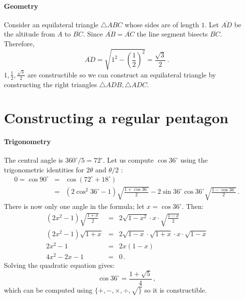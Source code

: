 \documentclass[11pt,a4paper]{article}
\newenvironment{form}[1]{%
\begin{displaymath}%
\renewcommand{\arraystretch}{#1}%
\begin{array}{lcl}}%
{\end{array}%
\end{displaymath}%
}
\newcommand*{\disfrac}[2]{\displaystyle\frac{#1}{#2}}
\begin{document}
\paragraph{Geometry} Consider an equilateral triangle $\triangle ABC$ whose sides are of length $1$. Let $\overline{AD}$ be the altitude from $A$ to $\overline{BC}$. Since $\overline{AB}=\overline{AC}$ the line segment bisects $\overline{BC}$. Therefore,
\[
\overline{AD}=\sqrt{1^2-\left(\disfrac{1}{2}\right)^2}=\disfrac{\sqrt{3}}{2}\,.
\]
$1,\frac{1}{2},\frac{\sqrt{3}}{2}$ are constructible so we can construct an equilateral triangle by constructing the right triangles $\triangle ADB,\triangle ADC$.
\begin{center}
\end{center}

\section{Constructing a regular pentagon}\label{a.pentagon}

\paragraph{Trigonometry}
The central angle is $360^\circ/5=72^\circ$. Let us compute $\cos 36^\circ$ using the  trigonometric identities for $2\theta$ and $\theta/2$ \cite{wiki:pentagon}:
\begin{form}{1.5}
0=\cos 90^\circ &=& \cos(72^\circ+18^\circ)\\
&=&(2\cos^2 36^\circ-1)\sqrt{\disfrac{1+\cos 36^\circ}{2}}-2\sin 36^\circ\cos 36^\circ\sqrt{\disfrac{1-\cos 36^\circ}{2}}\,.
\end{form}
There is now only one angle in the formula; let $x=\cos 36^\circ$. Then:
\begin{form}{1.5}
(2x^2-1)\sqrt{\disfrac{1+x}{2}}&=&2\sqrt{1-x^2}\cdot x \cdot \sqrt{\disfrac{1-x}{2}}\\
(2x^2-1)\sqrt{1+x}&=&2\sqrt{1-x}\cdot\sqrt{1+x}\cdot x \cdot \sqrt{1-x}\\
2x^2-1&=&2x(1-x)\\
4x^2-2x-1&=&0\,.
\end{form}
Solving the quadratic equation gives:
\[
\cos 36^\circ = \disfrac{1+\sqrt{5}}{4}\,,
\]
which can be computed using $\{+,-,\times,\div,\surd\}$ so it is constructible.
\end{document}
